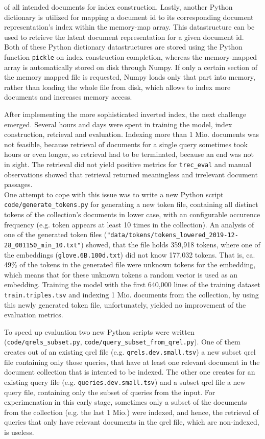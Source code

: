     of all intended documents for index construction.
Lastly, another Python dictionary is utilized for mapping a document id to its corresponding document representation's index within the memory-map array.
This datastructure can be used to retrieve the latent document representation for a given document id.
Both of these Python dictionary datastructures are stored using the Python function \texttt{pickle} on index construction completion,
    whereas the memory-mapped array is automatically stored on disk through Numpy.
If only a certain section of the memory mapped file is requested, Numpy loads only that part into memory, rather than loading the whole file from disk,
    which allows to index more documents and increases memory access.

After implementing the more sophisticated inverted index, the next challenge emerged.
Several hours and days were spent in training the model, index construction, retrieval and evaluation.
Indexing more than 1 Mio. documents was not feasible, because retrieval of documents for a single query sometimes took hours or even longer, so
    retrieval had to be terminated, because an end was not in sight.
The retrieval did not yield positive metrics for \verb|trec_eval| and manual observations showed that retrieval returned meaningless and irrelevant 
    document passages.\\
One attempt to cope with this issue was to write a new Python script \verb|code/generate_tokens.py| for generating a new token file, 
    containing all distinct tokens of the collection's documents in lower case, with an configurable occurence frequency 
    (e.g. token appears at least 10 times in the collection).
An analysis of one of the generated token files (\verb|"data/tokens/tokens_lowered_2019-12-28_001150_min_10.txt"|) showed,
    that the file holds 359,918 tokens, where one of the embeddings (\verb|glove.6B.100d.txt|) did not know 177,032 tokens.
That is, ca. 49\% of the tokens in the generated file were unknown tokens for the embedding,
    which means that for these unknown tokens a random vector is used as an embedding.
Training the model with the first 640,000 lines of the training dataset \verb|train.triples.tsv| and
    indexing 1 Mio. documents from the collection,
    by using this newly generated token file, unfortunately, yielded no improvement of the evaluation
    metrics.

To speed up evaluation two new Python scripts were written
    (\verb|code/qrels_subset.py|, \verb|code/query_subset_from_qrel.py|).
One of them creates out of an existing qrel file (e.g. \verb|qrels.dev.small.tsv|)
    a new subset qrel file containing only those queries, that have at least one 
    relevant document in the document collection that is intented to be indexed.
The other one creates for an existing query file (e.g. \verb|queries.dev.small.tsv|)
    and a subset qrel file a new query file, containing only the subset of queries from the input.
For experimenation in this early stage, sometimes only a subset of the documents from the 
    collection (e.g. the last 1 Mio.) were indexed, and hence, 
    the retrieval of queries that only have relevant documents in the qrel file, which are non-indexed,
    is useless.

